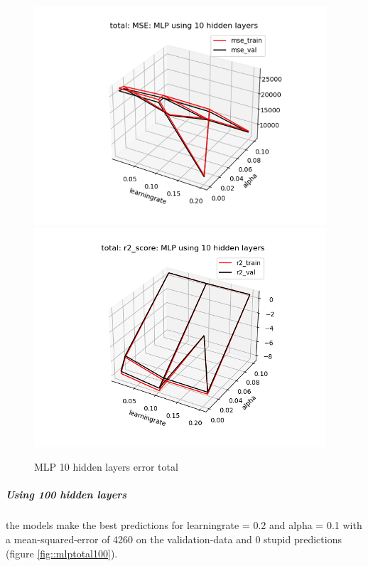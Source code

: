 \documentclass[12pt,a4paper]{scrartcl}		%
\begin{document}
\begin{figure}[h]
    \centering
    \includegraphics[scale = 1]{total_mlp_mse_10.png}
    \includegraphics[scale = 1]{total_mlp_r2_10.png}
    \caption{MLP 10 hidden layers error total}
    \label{fig::mlptotal10}
\end{figure}

\subparagraph{Using 100 hidden layers}
the models make the best predictions for learningrate = 0.2 and alpha = 0.1 with a mean-squared-error of 4260 on the validation-data and 0 stupid predictions
(figure \ref{fig::mlptotal100}).
\end{document}
